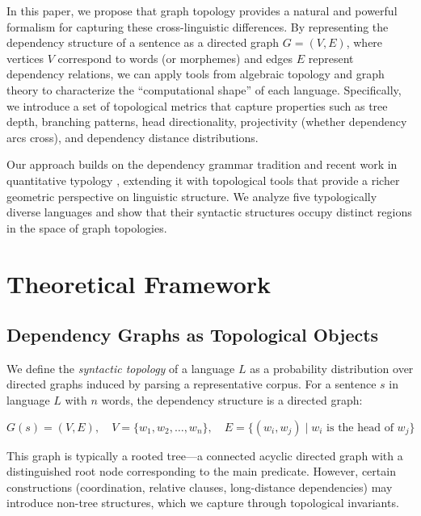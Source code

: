 \documentclass[11pt,a4paper]{article}
\begin{document}
In this paper, we propose that graph topology provides a natural and
powerful formalism for capturing these cross-linguistic differences. By
representing the dependency structure of a sentence as a directed graph
$G = (V, E)$, where vertices $V$ correspond to words (or morphemes)
and edges $E$ represent dependency relations, we can apply tools from
algebraic topology and graph theory to characterize the
``computational shape'' of each language. Specifically, we introduce a
set of topological metrics that capture properties such as tree depth,
branching patterns, head directionality, projectivity (whether dependency
arcs cross), and dependency distance distributions.

Our approach builds on the dependency grammar tradition
\citep{tesniere1959,melcuk1988} and recent work in quantitative
typology \citep{liu2008,futrell2015}, extending it with topological
tools that provide a richer geometric perspective on linguistic
structure. We analyze five typologically diverse languages and show that
their syntactic structures occupy distinct regions in the space of graph
topologies.

\section{Theoretical Framework}
\label{sec:framework}

\subsection{Dependency Graphs as Topological Objects}

We define the \emph{syntactic topology} of a language $L$ as a
probability distribution over directed graphs induced by parsing a
representative corpus. For a sentence $s$ in language $L$ with $n$
words, the dependency structure is a directed graph:

\begin{equation}
  G(s) = (V, E), \quad
  V = \{w_1, w_2, \dots, w_n\}, \quad
  E = \{(w_i, w_j) \mid w_i \text{ is the head of } w_j\}
  \label{eq:dep-graph}
\end{equation}

This graph is typically a rooted tree---a connected acyclic directed
graph with a distinguished root node corresponding to the main
predicate. However, certain constructions (coordination, relative
clauses, long-distance dependencies) may introduce non-tree structures,
which we capture through topological invariants.
\end{document}
